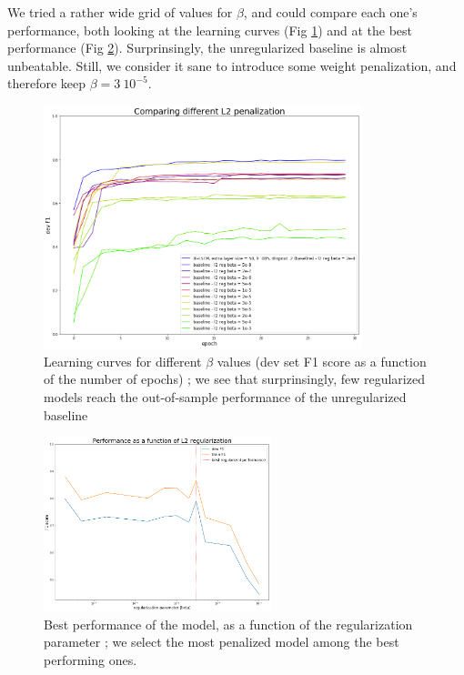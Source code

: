\documentclass{article} %
\begin{document}
We tried a rather wide grid of values for $\beta$, and could compare each one's performance, both looking at the learning curves (Fig \ref{l2_devf1}) and at the best performance (Fig \ref{l2_graph}). Surprinsingly, the unregularized baseline is almost unbeatable. Still, we consider it sane to introduce some weight penalization, and therefore keep $\beta=3~10^{-5}$.


\begin{figure}[h!]
\begin{center}
\includegraphics[width=350px]{figs/l2_devf1.png}
\caption{Learning curves for different $\beta$ values (dev set F1 score as a function of the number of epochs) ; we see that surprinsingly, few regularized models reach the out-of-sample performance of the unregularized baseline}
\label{l2_devf1}
\end{center}
\end{figure}

\begin{figure}[h!]
\begin{center}
\includegraphics[width=250px]{figs/l2_graph.png}
\caption{Best performance of the model, as a function of the regularization parameter ; we select the most penalized model among the best performing ones.}
\label{l2_graph}
\end{center}
\end{figure}
\end{document}
